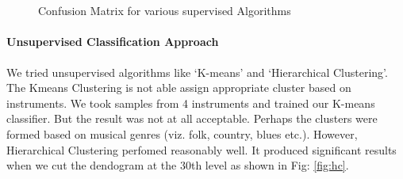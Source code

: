 \documentclass[conference]{IEEEtran}
\begin{document}
	\begin{figure}[h!]
	\centering
	\\
	\\
	\caption{Confusion Matrix for various supervised Algorithms}
	\label{figur}
\end{figure}

\paragraph{Unsupervised Classification Approach}

We tried unsupervised algorithms like `K-means' and `Hierarchical Clustering'. The Kmeans Clustering is not able assign appropriate cluster based on instruments. We took samples from 4 instruments and trained our K-means classifier. But the result was not at all acceptable. Perhaps the clusters were formed based on musical genres (viz. folk, country, blues etc.). However, Hierarchical Clustering perfomed reasonably well. It produced significant results when we cut the dendogram at the 30th level as shown in Fig: \ref{fig:hc}. 

	
	
\end{document}
